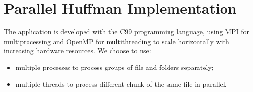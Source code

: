 \section{Parallel Huffman Implementation}
The application is developed with the C99 programming language, using MPI for multiprocessing and OpenMP for multithreading to scale horizontally with increasing hardware resources. We choose to use:
\begin{itemize}
    \item multiple processes to process groups of file and folders separately;
    \item multiple threads to process different chunk of the same file in parallel.
\end{itemize}
